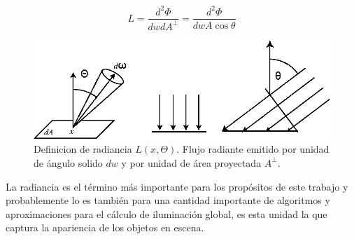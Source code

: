 \begin{equation}
    L = \frac{d^2\Phi}{dwdA^\bot} = \frac{d^2\Phi}{dwA\cos\theta}
	\label{eq:radiance_eq}
\end{equation}

\begin{figure}[H]
	\centering
	\includegraphics[width=0.85\linewidth]{media/radiance.eps}
	\caption{Definicion de radiancia $L(x,\Theta)$. Flujo radiante emitido por unidad de ángulo solido $dw$ y por unidad de área proyectada $A^\bot$.}
	\label{fig:radiance_fi}
\end{figure}

La radiancia es el término más importante para los propósitos de este trabajo y probablemente lo es también para una cantidad importante de algoritmos y aproximaciones para el cálculo de iluminación global, es esta unidad la que captura la apariencia de los objetos en escena.
